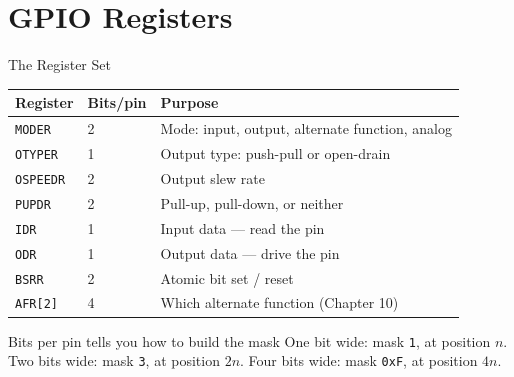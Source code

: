 \documentclass[9pt,aspectratio=169,xcolor=table]{beamer}
\begin{document}
\section{GPIO Registers}

\begin{frame}{The Register Set}
    \begin{center}
    {\small
    \striped
    \begin{tabular}{@{}l l R{.50\textwidth}@{}}
        \toprule
        \textbf{Register} & \textbf{Bits/pin} & \textbf{Purpose} \\
        \midrule
        \texttt{MODER}   & 2 & Mode: input, output, alternate function, analog \\
        \texttt{OTYPER}  & 1 & Output type: push-pull or open-drain \\
        \texttt{OSPEEDR} & 2 & Output slew rate \\
        \texttt{PUPDR}   & 2 & Pull-up, pull-down, or neither \\
        \texttt{IDR}     & 1 & \alert{Input} data --- read the pin \\
        \texttt{ODR}     & 1 & \alert{Output} data --- drive the pin \\
        \texttt{BSRR}    & 2 & Atomic bit set / reset \\
        \texttt{AFR[2]}  & 4 & Which alternate function (Chapter 10) \\
        \bottomrule
    \end{tabular}}
    \end{center}

    \vspace{2mm}
    \begin{block}{Bits per pin tells you how to build the mask}
        One bit wide: mask \texttt{1}, at position $n$.
        Two bits wide: mask \texttt{3}, at position $2n$.
        Four bits wide: mask \texttt{0xF}, at position $4n$.
    \end{block}
\end{frame}
\end{document}
